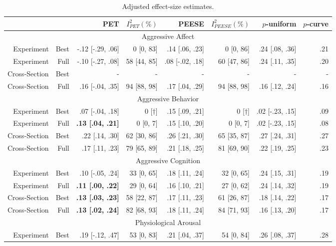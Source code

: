 \documentclass[jou]{apa6}
\begin{document}
\begin{table}[htbp]
	\small
	\centering
	\caption{Adjusted effect-size estimates.}
	\begin{tabular}{rrrrrrrr}
		\toprule
		&       & PET   & $I^2_{PET} (\%)$ & PEESE & $I^2_{PEESE} (\%)$ & $p$-uniform & $p$-curve \\
		\midrule
		\multicolumn{8}{c}{Aggressive Affect} \\
		Experiment & Best  & -.12 [-.29, .06] & 0 [0, 83] & .14 [.06, .23] &  0 [0, 86] & .24 [.08, .36] & .21 \\
		Experiment & Full  & -.10 [-.27, .08] & 58 [44, 85] & .08 [-.02, .18] & 60 [47, 86] & .24 [.11, .35] & .20 \\
		Cross-Section & Best  & -     & -     & -     & -     & -     & - \\
		Cross-Section & Full  &  .16 [-.04, .35] & 94 [88, 98] & .17 [.04, .29] & 94 [88, 98] & .16 [.12, .24] & .16 \\
		\multicolumn{8}{c}{Aggressive Behavior} \\
		Experiment & Best  &  .07 [-.04, .18] &  0 [$\dagger$] & .15 [.09, .21] &  0 [$\dagger$] & .02 [-.23, .15] & .09 \\
		Experiment & Full  &  \textbf{.13 [.04, .21]} & 0 [0, 7] & .15 [.10, .20] & 0 [0, 7] & .02 [-.23, .15] & .08 \\
		Cross-Section & Best  &  .22 [.14, .30] & 62 [30, 86] & .26 [.21, .30] & 65 [35, 87] & .27 [.24, .31] & .27 \\
		Cross-Section & Full  &  .17 [.11, .23] & 79 [65, 89] & .21 [.18, .25] & 81 [69, 90] & .22 [.19, .25] & .23 \\
		\multicolumn{8}{c}{Aggressive Cognition} \\
		Experiment & Best  &  .10 [-.05, .24] & 33 [0, 65] & .18 [.11, .24] & 32 [0, 65] & .24 [.15, .31] & .19 \\
		Experiment & Full  &  \textbf{.11 [.00, .22]} & 29 [0, 64] & .16 [.10, .21] & 27 [0, 62] & .24 [.14, .32] & .19 \\
		Cross-Section & Best  &  \textbf{.13 [.03, .23]} & 58 [22, 87] & .17 [.11, .23] & 61 [26, 87] & .18 [.14, .22] & .17 \\
		Cross-Section & Full  &  \textbf{.13 [.02, .24]} & 82 [68, 93] & .18 [.11, .24] & 84 [71, 93] & .16 [.13, .20] & .17 \\
		\multicolumn{8}{c}{Physiological Arousal} \\
		Experiment & Best  &  .19 [-.12, .47] & 53 [0, 83] & .21 [.04, .37] & 54 [0, 84] & .26 [.08, .37] & .28 \\

\end{tabular}
\end{table}
\end{document}
